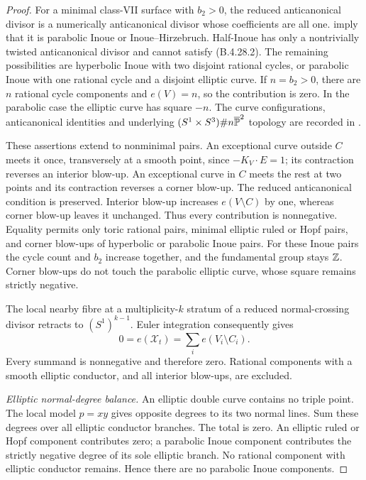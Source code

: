 \begin{proof}
For a minimal class-VII surface with $b_2>0$, the
reduced anticanonical divisor is a numerically
anticanonical divisor whose coefficients are all one.
\citet[Corollary 2.25, Lemma 2.26 and Proposition
2.27]{Dloussky2005AB} imply that it is parabolic Inoue
or Inoue--Hirzebruch. Half-Inoue has only a nontrivially
twisted anticanonical divisor and cannot satisfy
(B.4.28.2). The remaining possibilities are hyperbolic
Inoue with two disjoint rational cycles, or parabolic
Inoue with one rational cycle and a disjoint elliptic
curve. If $n=b_2>0$, there are $n$ rational cycle
components and $e(V)=n$, so the contribution is zero.
In the parabolic case the elliptic curve has square
$-n$. The curve configurations, anticanonical identities
and underlying $(S^1\times S^3)\#n\overline{\mathbb P}^2$
topology are recorded in
\citet[Sections 3.2--3.3]{FujikiPontecorvo2010AB}.

These assertions extend to nonminimal pairs. An
exceptional curve outside $C$ meets it once, transversely
at a smooth point, since $-K_V\cdot E=1$; its contraction
reverses an interior blow-up. An exceptional curve in
$C$ meets the rest at two points and its contraction
reverses a corner blow-up. The reduced anticanonical
condition is preserved. Interior blow-up increases
$e(V\setminus C)$ by one, whereas corner blow-up leaves
it unchanged. Thus every contribution is nonnegative.
Equality permits only toric rational pairs, minimal
elliptic ruled or Hopf pairs, and corner blow-ups of
hyperbolic or parabolic Inoue pairs. For these Inoue
pairs the cycle count and $b_2$ increase together, and
the fundamental group stays $\mathbb Z$. Corner blow-ups do
not touch the parabolic elliptic curve, whose square
remains strictly negative.

The local nearby fibre at a multiplicity-$k$ stratum
of a reduced normal-crossing divisor retracts to
$(S^1)^{k-1}$. Euler integration consequently gives
\[
 0=e(\mathcal X_t)=\sum_i e(V_i\setminus C_i).          \tag{B.4.28.4}
\]
Every summand is nonnegative and therefore zero.
Rational components with a smooth elliptic conductor,
and all interior blow-ups, are excluded.

\emph{Elliptic normal-degree balance.}
An elliptic double curve contains no triple point.
The local model $p=xy$ gives opposite degrees to its
two normal lines. Sum these degrees over all elliptic
conductor branches. The total is zero. An elliptic
ruled or Hopf component contributes zero; a parabolic
Inoue component contributes the strictly negative
degree of its sole elliptic branch. No rational
component with elliptic conductor remains. Hence there
are no parabolic Inoue components.


\end{proof}
